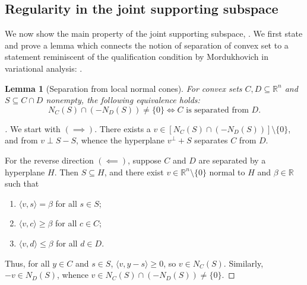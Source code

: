 \documentclass{article}
\theoremstyle{plain}
\newtheorem{lemma}{Lemma}[section]
\theoremstyle{definition}
\theoremstyle{remark}
\begin{document}
\subsection{Regularity in the joint supporting subspace }
\label{loc:body.proofs.regularity_in_the_joint_supporting_subspace}
We now show the main property of the joint supporting subspace, 
.
We first state and prove a lemma which connects the notion of separation
of convex set to a statement reminiscent of the qualification condition
by Mordukhovich in variational analysis: \cite[Theorem
2.19]{mordukhovich_VariationalAnalysisApplications_2018}.
\begin{lemma}[Separation from local normal cones]
\label{loc:separation_from_local_normal_cones.statement}
For convex sets $C, D \subseteq \mathbb{R}^n$ and $S \subseteq C \cap D$ nonempty, the following equivalence holds:
\begin{equation}
\label{eq:main_sep}
N_C(S) \cap (-N_D(S)) \neq \{0\} \iff C \text{ is separated from } D.
\end{equation}
\end{lemma}
\begin{proof}[\hypertarget{loc:separation_from_local_normal_cones.proof}Proof of \Cref{loc:separation_from_local_normal_cones.statement}]

We start with $(\implies)$. There exists a $v \in [N_C(S) \cap (-N_D(S))] \setminus \{0\}$,
and from  $v \perp S-S$, whence 
the hyperplane $v^\perp + S$ separates $C$ from $D$.

For the reverse direction $(\impliedby)$, suppose $C$ and $D$ are
separated by a hyperplane $H$. Then $S \subseteq H$, and there exist
$v \in \mathbb{R}^n \setminus \{0\}$ normal to $H$ and $\beta \in \mathbb{R}$
such that
\begin{enumerate}
\item $\langle v, s \rangle = \beta$ for all $s \in S$;
\item $\langle v, c \rangle \ge \beta$ for all $c \in C$;
\item $\langle v, d \rangle \le \beta$ for all $d \in D$.
\end{enumerate}

Thus, for all $y \in C$ and $s \in S$, $\langle v, y - s \rangle \ge 0$,
so $v \in N_C(S)$. Similarly, $-v \in N_D(S)$, whence
$v \in N_C(S) \cap (-N_D(S)) \neq \{0\}$.
\end{proof}
\end{document}
